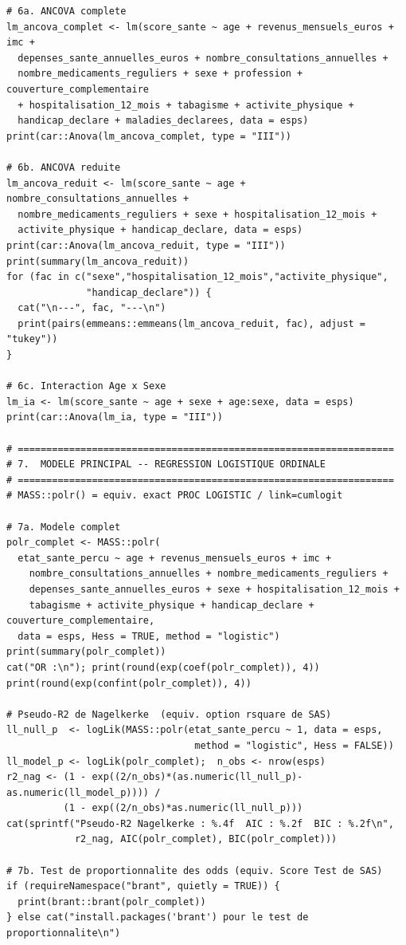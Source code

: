 \documentclass[11pt,a4paper]{memoirerecherche}
\begin{document}
\begin{footnotesize}
\begin{verbatim}
# 6a. ANCOVA complete
lm_ancova_complet <- lm(score_sante ~ age + revenus_mensuels_euros + imc +
  depenses_sante_annuelles_euros + nombre_consultations_annuelles +
  nombre_medicaments_reguliers + sexe + profession + couverture_complementaire
  + hospitalisation_12_mois + tabagisme + activite_physique +
  handicap_declare + maladies_declarees, data = esps)
print(car::Anova(lm_ancova_complet, type = "III"))

# 6b. ANCOVA reduite
lm_ancova_reduit <- lm(score_sante ~ age + nombre_consultations_annuelles +
  nombre_medicaments_reguliers + sexe + hospitalisation_12_mois +
  activite_physique + handicap_declare, data = esps)
print(car::Anova(lm_ancova_reduit, type = "III"))
print(summary(lm_ancova_reduit))
for (fac in c("sexe","hospitalisation_12_mois","activite_physique",
              "handicap_declare")) {
  cat("\n---", fac, "---\n")
  print(pairs(emmeans::emmeans(lm_ancova_reduit, fac), adjust = "tukey"))
}

# 6c. Interaction Age x Sexe
lm_ia <- lm(score_sante ~ age + sexe + age:sexe, data = esps)
print(car::Anova(lm_ia, type = "III"))

# ==================================================================
# 7.  MODELE PRINCIPAL -- REGRESSION LOGISTIQUE ORDINALE
# ==================================================================
# MASS::polr() = equiv. exact PROC LOGISTIC / link=cumlogit

# 7a. Modele complet
polr_complet <- MASS::polr(
  etat_sante_percu ~ age + revenus_mensuels_euros + imc +
    nombre_consultations_annuelles + nombre_medicaments_reguliers +
    depenses_sante_annuelles_euros + sexe + hospitalisation_12_mois +
    tabagisme + activite_physique + handicap_declare + couverture_complementaire,
  data = esps, Hess = TRUE, method = "logistic")
print(summary(polr_complet))
cat("OR :\n"); print(round(exp(coef(polr_complet)), 4))
print(round(exp(confint(polr_complet)), 4))

# Pseudo-R2 de Nagelkerke  (equiv. option rsquare de SAS)
ll_null_p  <- logLik(MASS::polr(etat_sante_percu ~ 1, data = esps,
                                 method = "logistic", Hess = FALSE))
ll_model_p <- logLik(polr_complet);  n_obs <- nrow(esps)
r2_nag <- (1 - exp((2/n_obs)*(as.numeric(ll_null_p)-as.numeric(ll_model_p)))) /
          (1 - exp((2/n_obs)*as.numeric(ll_null_p)))
cat(sprintf("Pseudo-R2 Nagelkerke : %.4f  AIC : %.2f  BIC : %.2f\n",
            r2_nag, AIC(polr_complet), BIC(polr_complet)))

# 7b. Test de proportionnalite des odds (equiv. Score Test de SAS)
if (requireNamespace("brant", quietly = TRUE)) {
  print(brant::brant(polr_complet))
} else cat("install.packages('brant') pour le test de proportionnalite\n")


\end{verbatim}
\end{footnotesize}
\end{document}
